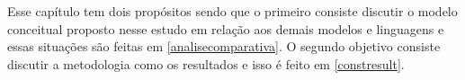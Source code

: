 Esse capítulo tem dois propósitos sendo que o primeiro consiste discutir o modelo conceitual proposto nesse estudo em relação aos demais modelos e linguagens e essas situações são feitas em  \ref{analisecomparativa}. O segundo objetivo consiste discutir a metodologia como os resultados e isso é feito em \ref{constresult}.
